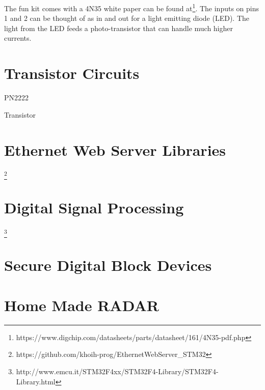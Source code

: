 \documentclass{article}
\begin{document}
The fun kit comes with a 4N35 white paper can be found at\footnote{https://www.digchip.com/datasheets/parts/datasheet/161/4N35-pdf.php}. The inputs on pins 1 and 2 can be thought of as in and out for a light emitting diode (LED).  The light from the LED feeds a photo-transistor that can handle much higher currents. 


\section{Transistor Circuits} %
\label{sec:transistor_circuits}

PN2222

Transistor




\section{Ethernet Web Server Libraries} %
\label{sec:ethernet_web_server_libraries}

\footnote{https://github.com/khoih-prog/EthernetWebServer\_STM32}




\section{Digital Signal Processing} %
\label{sec:digital_signal_processing}

\footnote{http://www.emcu.it/STM32F4xx/STM32F4-Library/STM32F4-Library.html}






\section{Secure Digital Block Devices} %
\label{sec:secure_digital_block_devices}




\section{Home Made RADAR} %
\label{sec:home_made_radar}
\end{document}
